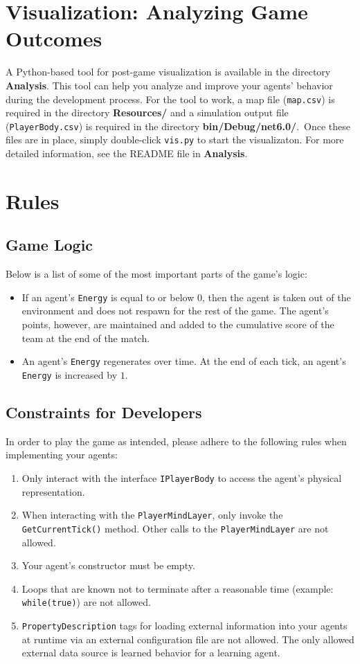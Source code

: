 \documentclass[a4paper,english,DIV=16,11pt,parskip=half,dvipsnames,listof=totoc,index=totoc,bibliography=totoc]{scrartcl}
\newcommand\todo[1]{\textcolor{red}{#1}}
\begin{document}
\section{Visualization: Analyzing Game Outcomes} \label{sec:vis}
%
A Python-based tool for post-game visualization is available in the directory \textbf{Analysis}. This tool can help you analyze and improve your agents' behavior during the development process. For the tool to work, a map file (\texttt{map.csv}) is required in the directory \textbf{Resources/} and a simulation output file (\texttt{PlayerBody.csv}) is required in the directory \textbf{bin/Debug/net6.0/}.~Once these files are in place, simply double-click \texttt{vis.py} to start the visualizaton. For more detailed information, see the README file in \textbf{Analysis}.
%
%
\section{Rules} \label{sec:rules}
%
\subsection{Game Logic}
Below is a list of some of the most important parts of the game's logic:
%
\begin{itemize}
  \item If an agent's \texttt{Energy} is equal to or below 0, then the agent is taken out of the environment and does not respawn for the rest of the game. The agent's points, however, are maintained and added to the cumulative score of the team at the end of the match.
  \item An agent's \texttt{Energy} regenerates over time. At the end of each tick, an agent's \texttt{Energy} is increased by $1$.
\end{itemize}
%
\subsection{Constraints for Developers}
In order to play the game as intended, please adhere to the following rules when implementing your agents:
\begin{enumerate}
  \item Only interact with the interface \texttt{IPlayerBody} to access the agent's physical representation.
  \item When interacting with the \texttt{PlayerMindLayer}, only invoke the \texttt{GetCurrentTick()} method. Other calls to the \texttt{PlayerMindLayer} are not allowed.
  \item Your agent's constructor must be empty. %
  \item Loops that are known not to terminate after a reasonable time (example: \texttt{while(true)}) are not allowed.
  \item \texttt{PropertyDescription} tags for loading external information into your agents at runtime via an external configuration file are not allowed. The only allowed external data source is learned behavior for a learning agent.
\end{enumerate}
%
\end{document}
